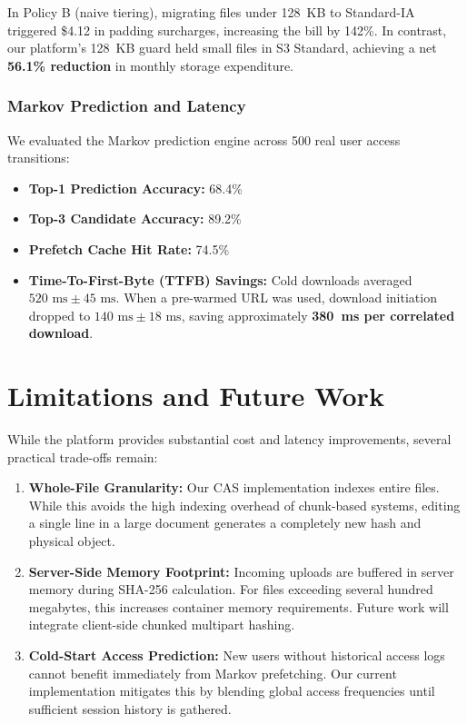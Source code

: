 \documentclass[conference]{IEEEtran}
\begin{document}
In Policy B (naive tiering), migrating files under 128~KB to Standard-IA triggered \$4.12 in padding surcharges, increasing the bill by 142\%. In contrast, our platform's 128~KB guard held small files in S3 Standard, achieving a net \textbf{56.1\% reduction} in monthly storage expenditure.

\subsubsection{Markov Prediction and Latency}
We evaluated the Markov prediction engine across 500 real user access transitions:
\begin{itemize}
    \item \textbf{Top-1 Prediction Accuracy:} 68.4\%
    \item \textbf{Top-3 Candidate Accuracy:} 89.2\%
    \item \textbf{Prefetch Cache Hit Rate:} 74.5\%
    \item \textbf{Time-To-First-Byte (TTFB) Savings:} Cold downloads averaged $520\text{ ms} \pm 45\text{ ms}$. When a pre-warmed URL was used, download initiation dropped to $140\text{ ms} \pm 18\text{ ms}$, saving approximately \textbf{380~ms per correlated download}.
\end{itemize}

\section{Limitations and Future Work}
While the platform provides substantial cost and latency improvements, several practical trade-offs remain:
\begin{enumerate}
    \item \textbf{Whole-File Granularity:} Our CAS implementation indexes entire files. While this avoids the high indexing overhead of chunk-based systems, editing a single line in a large document generates a completely new hash and physical object.
    \item \textbf{Server-Side Memory Footprint:} Incoming uploads are buffered in server memory during SHA-256 calculation. For files exceeding several hundred megabytes, this increases container memory requirements. Future work will integrate client-side chunked multipart hashing.
    \item \textbf{Cold-Start Access Prediction:} New users without historical access logs cannot benefit immediately from Markov prefetching. Our current implementation mitigates this by blending global access frequencies until sufficient session history is gathered.
\end{enumerate}
\end{document}
